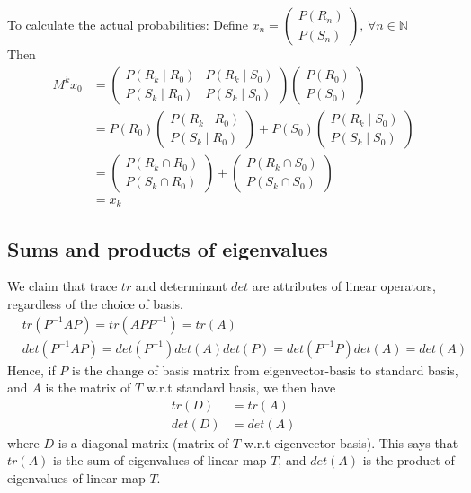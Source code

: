 \documentclass{article}
\begin{document}
To calculate the actual probabilities:
Define $x_n=\begin{pmatrix}
	P(R_n)\\
	P(S_n)
\end{pmatrix}
,\, \forall n\in \mathbb{N}$\\
Then \begin{align*}
	M^kx_0&=\begin{pmatrix}
		P(R_{k}\mid R_0) & P(R_{k}\mid S_0)\\
		P(S_{k}\mid R_0) & P(S_{k}\mid S_0)
	\end{pmatrix}\begin{pmatrix}
		P(R_0)\\
		P(S_0)
	\end{pmatrix}\\
	&=P(R_0)\begin{pmatrix}
		P(R_{k}\mid R_0)\\
		P(S_{k}\mid R_0)
	\end{pmatrix}+
	P(S_0)\begin{pmatrix}
		P(R_{k}\mid S_0)\\
		P(S_{k}\mid S_0)
	\end{pmatrix}\\
	&=\begin{pmatrix}
		P(R_{k}\cap R_0)\\
		P(S_{k}\cap R_0)
	\end{pmatrix}+
	\begin{pmatrix}
		P(R_{k}\cap S_0)\\
		P(S_{k}\cap S_0)
	\end{pmatrix}\\
	&=x_k
\end{align*}
\subsection{Sums and products of eigenvalues}
We claim that trace $tr$ and determinant $det$ are attributes of linear operators, regardless of the choice of basis.
\begin{align*}
&tr(P^{-1}AP)=tr(APP^{-1})=tr(A)\\
&det(P^{-1}AP)=det(P^{-1})det(A)det(P)=det(P^{-1}P)det(A)=det(A)
\end{align*}
Hence, if $P$ is the change of basis matrix from eigenvector-basis to standard basis, and $A$ is the matrix of $T$ w.r.t standard basis, we then have 
\begin{align*}
	tr(D) &= tr(A)\\
	det(D) &= det(A)
\end{align*} 
where $D$ is a diagonal matrix (matrix of $T$ w.r.t eigenvector-basis). This says that $tr(A)$ is the sum of eigenvalues of linear map $T$, and $det(A)$ is the product of eigenvalues of linear map $T$.
\end{document}
